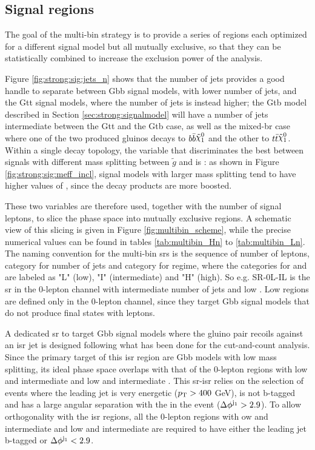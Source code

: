 \subsection{Signal regions}

The goal of the multi-bin strategy is to provide a series of regions each optimized for a different signal model 
but all mutually exclusive, so that they can be statistically combined to increase the exclusion power of the analysis.

Figure \ref{fig:strong:sig:jets_n} shows that the number of jets provides a good handle to separate 
between Gbb signal models, with lower number of jets, and the Gtt signal models, where the number of jets is instead higher;
the Gtb model described in Section \ref{sec:strong:signalmodel} will have a number of jets intermediate between the Gtt and the Gtb case, 
as well as the mixed-\gls{br} case where one of the two produced gluinos decays to $b \bar{b} \ninoone$ and the other to 
$t \bar{t} \ninoone$.
Within a single decay topology, the variable that discriminates the best between signals with different mass splitting between $\tilde{g}$ and
\ninoone is \meff: as shown in Figure \ref{fig:strong:sig:meff_incl}, signal models with larger mass splitting tend to have higher values 
of \meff, since the decay products are more boosted. 

These two variables are therefore used, together with the number of signal leptons, to slice the phase space into mutually exclusive regions. 
A schematic view of this slicing is given in Figure \ref{fig:multibin_scheme}, while the precise numerical values can be found 
in tables \ref{tab:multibin_Hn} to \ref{tab:multibin_Ln}.
The naming convention for the multi-bin \glspl{sr} is the sequence of number of leptons, category for number of jets and category for \meff regime,
where the categories for \njet and \meff are labeled as "L" (low), "I" (intermediate) and "H" (high). So e.g. SR-0L-IL is the \gls{sr} in the 0-lepton channel with intermediate number of jets and low \meff. Low \meff regions are defined only in the 0-lepton channel, since they 
target Gbb signal models that do not produce final states with leptons. 

A dedicated \gls{sr} to target Gbb signal models where the gluino pair recoils against an \gls{isr} jet is designed following 
what has been done for the cut-and-count analysis. 
Since the primary target of this \gls{isr} region are Gbb models with low mass splitting, its ideal phase space 
overlaps with that of the 0-lepton regions with low and intermediate \njet and low and intermediate \meff. 
This \gls{sr}-\gls{isr} relies on the selection of events where the leading jet is very energetic ($p_{\rm T} > 400$ GeV),
 is not b-tagged and has a large angular separation with the \met in the event (${\Delta}\phi^{\mathrm{j}_1} > 2.9$). 
To allow orthogonality with the \gls{isr} regions, all the 0-lepton regions with ow and intermediate \njet and low and intermediate \meff
are required to have either the leading jet b-tagged or ${\Delta}\phi^{\mathrm{j}_1} < 2.9$. 

